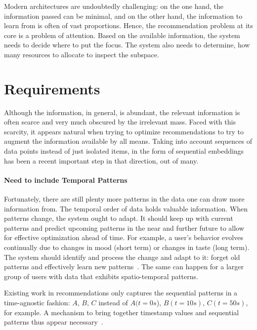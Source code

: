 Modern architectures are undoubtedly challenging: on the one hand, the information passed can be minimal, and on the other hand, the information to learn from is often of vast proportions. Hence, the recommendation problem at its core is a problem of attention. Based on the available information, the system needs to decide where to put the focus. The system also needs to determine, how many resources to allocate to inspect the subspace.


\section{Requirements}

Although the information, in general, is abundant, the relevant information is often scarce and very much obscured by the irrelevant mass. Faced with this scarcity, it appears natural when trying to optimize recommendations to try to augment the information available by all means. Taking into account sequences of data points instead of just isolated items, in the form of sequential embeddings~\cite{Githubbert4rec, tang2018personalized, rendlefactorizing} has been a recent important step in that direction, out of many.

\paragraph{Need to include Temporal Patterns}
%
Fortunately, there are still plenty more patterns in the data one can draw more information from. The temporal order of data holds valuable information. When patterns change, the system ought to adapt. It should keep up with current patterns and predict upcoming patterns in the near and further future to allow for effective optimization ahead of time. For example, a user's behavior evolves continually due to changes in mood (short term) or changes in taste (long term). The system should identify and process the change and adapt to it: forget old patterns and effectively learn new patterns~\cite{tsymbal2004problem}. The same can happen for a larger group of users with data that exhibits spatio-temporal patterns. 

Existing work in recommendations only captures the sequential patterns in a time-agnostic fashion: $ A $, $ B $, $ C $ instead of $ A(t=0s $), $ B(t=10s) $, $ C(t=50s) $, for example. A mechanism to bring together timestamp values and sequential patterns thus appear necessary~\cite{wang2019survey, wang2019sequential}.

